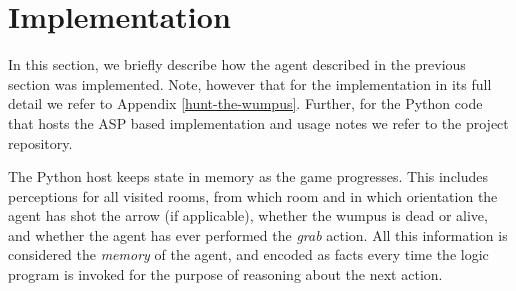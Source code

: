 \documentclass{llncs}
\begin{document}
\section{Implementation}

In this section, we briefly describe how the agent described in the previous section was implemented. Note, however that for the implementation in its full detail we refer to Appendix \ref{hunt-the-wumpus}. Further, for the Python code that hosts the ASP based implementation and usage notes we refer to the project repository.

The Python host keeps state in memory as the game progresses. This includes perceptions for all visited rooms, from which room and in which orientation the agent has shot the arrow (if applicable), whether the wumpus is dead or alive, and whether the agent has ever performed the \emph{grab} action. All this information is considered the \emph{memory} of the agent, and encoded as facts every time the logic program is invoked for the purpose of reasoning about the next action.

\begin{figure}
\end{figure}

\end{document}
